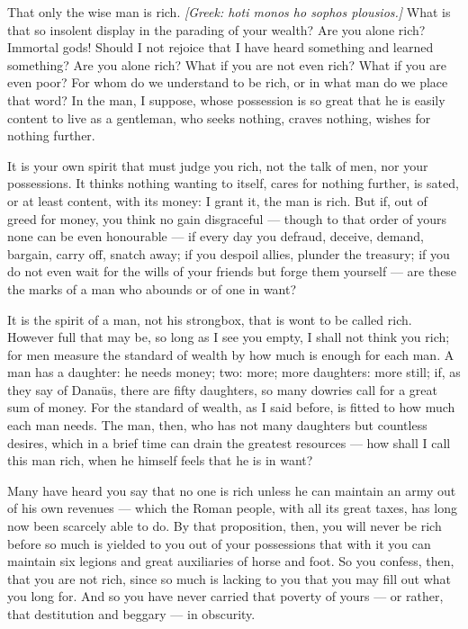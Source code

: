  That only the wise man is rich. \textit{[Greek: hoti monos ho sophos plousios.]} What is that so insolent display in the parading of your wealth? Are you alone rich? Immortal gods! Should I not rejoice that I have heard something and learned something? Are you alone rich? What if you are not even rich? What if you are even poor? For whom do we understand to be rich, or in what man do we place that word? In the man, I suppose, whose possession is so great that he is easily content to live as a gentleman, who seeks nothing, craves nothing, wishes for nothing further.

 It is your own spirit that must judge you rich, not the talk of men, nor your possessions. It thinks nothing wanting to itself, cares for nothing further, is sated, or at least content, with its money: I grant it, the man is rich. But if, out of greed for money, you think no gain disgraceful — though to that order of yours none can be even honourable — if every day you defraud, deceive, demand, bargain, carry off, snatch away; if you despoil allies, plunder the treasury; if you do not even wait for the wills of your friends but forge them yourself — are these the marks of a man who abounds or of one in want?

 It is the spirit of a man, not his strongbox, that is wont to be called rich. However full that may be, so long as I see you empty, I shall not think you rich; for men measure the standard of wealth by how much is enough for each man. A man has a daughter: he needs money; two: more; more daughters: more still; if, as they say of Danaüs, there are fifty daughters, so many dowries call for a great sum of money. For the standard of wealth, as I said before, is fitted to how much each man needs. The man, then, who has not many daughters but countless desires, which in a brief time can drain the greatest resources — how shall I call this man rich, when he himself feels that he is in want?

 Many have heard you say that no one is rich unless he can maintain an army out of his own revenues — which the Roman people, with all its great taxes, has long now been scarcely able to do. By that proposition, then, you will never be rich before so much is yielded to you out of your possessions that with it you can maintain six legions and great auxiliaries of horse and foot. So you confess, then, that you are not rich, since so much is lacking to you that you may fill out what you long for. And so you have never carried that poverty of yours — or rather, that destitution and beggary — in obscurity.

